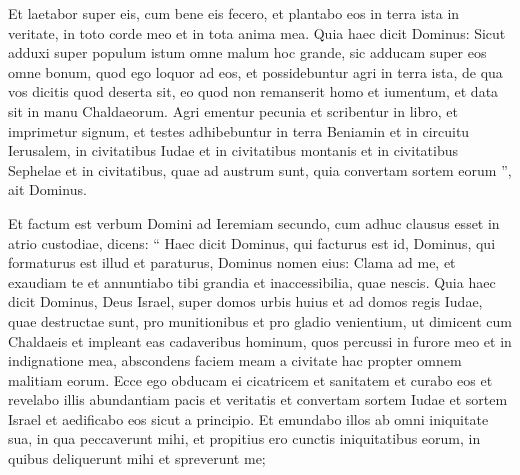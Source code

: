\begin{biblechapter}
\begin{biblechapter}
\begin{biblechapter}
\begin{biblechapter}
\begin{biblechapter}
\begin{biblechapter}
\begin{biblechapter}
\begin{biblechapter}
\begin{biblechapter}
\begin{biblechapter}
\begin{biblechapter}
\begin{biblechapter}
\begin{biblechapter}
\begin{biblechapter}
\begin{biblechapter}
\begin{biblechapter}
\begin{biblechapter}
\begin{biblechapter}
\begin{biblechapter}
\begin{biblechapter}
\begin{biblechapter}
\begin{biblechapter}
\begin{biblechapter}
\begin{biblechapter}
\begin{biblechapter}
\begin{biblechapter}
\begin{biblechapter}
\begin{biblechapter}
\begin{biblechapter}
\begin{biblechapter}
\begin{biblechapter}
\begin{biblechapter}
\verse Et laetabor super eis, cum bene eis fecero, et plantabo eos in terra ista in veritate, in toto corde meo et in tota anima mea. 
\verse Quia haec dicit Dominus: Sicut adduxi super populum istum omne malum hoc grande, sic adducam super eos omne bonum, quod ego loquor ad eos, 
\verse et possidebuntur agri in terra ista, de qua vos dicitis quod deserta sit, eo quod non remanserit homo et iumentum, et data sit in manu Chaldaeorum. 
\verse Agri ementur pecunia et scribentur in libro, et imprimetur signum, et testes adhibebuntur in terra Beniamin et in circuitu Ierusalem, in civitatibus Iudae et in civitatibus montanis et in civitatibus Sephelae et in civitatibus, quae ad austrum sunt, quia convertam sortem eorum ”, ait Dominus.
 
\begin{biblechapter}
\verse Et factum est verbum Domini ad Ieremiam secundo, cum adhuc clausus esset in atrio custodiae, dicens: 
\verse “ Haec dicit Dominus, qui facturus est id, Dominus, qui formaturus est illud et paraturus, Dominus nomen eius: 
\verse Clama ad me, et exaudiam te et annuntiabo tibi grandia et inaccessibilia, quae nescis. 
 \verse Quia haec dicit Dominus, Deus Israel, super domos urbis huius et ad domos regis Iudae, quae destructae sunt, pro munitionibus et pro gladio 
\verse venientium, ut dimicent cum Chaldaeis et impleant eas cadaveribus hominum, quos percussi in furore meo et in indignatione mea, abscondens faciem meam a civitate hac propter omnem malitiam eorum. 
\verse Ecce ego obducam ei cicatricem et sanitatem et curabo eos et revelabo illis abundantiam pacis et veritatis 
\verse et convertam sortem Iudae et sortem Israel et aedificabo eos sicut a principio. 
 \verse Et emundabo illos ab omni iniquitate sua, in qua peccaverunt mihi, et propitius ero cunctis iniquitatibus eorum, in quibus deliquerunt mihi et spreverunt me; 

\end{biblechapter}
\end{biblechapter}
\end{biblechapter}
\end{biblechapter}
\end{biblechapter}
\end{biblechapter}
\end{biblechapter}
\end{biblechapter}
\end{biblechapter}
\end{biblechapter}
\end{biblechapter}
\end{biblechapter}
\end{biblechapter}
\end{biblechapter}
\end{biblechapter}
\end{biblechapter}
\end{biblechapter}
\end{biblechapter}
\end{biblechapter}
\end{biblechapter}
\end{biblechapter}
\end{biblechapter}
\end{biblechapter}
\end{biblechapter}
\end{biblechapter}
\end{biblechapter}
\end{biblechapter}
\end{biblechapter}
\end{biblechapter}
\end{biblechapter}
\end{biblechapter}
\end{biblechapter}
\end{biblechapter}
